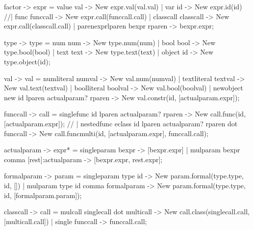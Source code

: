     factor      {-> expr}   =   {value} val                                             {-> New expr.val(val.val)}
                            |   {var} id                                                {-> New expr.id(id)}
                            //|   {func} funccall                                         {-> New expr.call(funccall.call)}
                            |   {classcall} classcall                                   {-> New expr.call(classcall.call)}
                            |   {parenexpr}lparen bexpr rparen                          {-> bexpr.expr};

    type        {-> type}   =   {num} num                                               {-> New type.num(num)}
                            |   {bool} bool                                             {-> New type.bool(bool)}
                            |   {text} text                                             {-> New type.text(text)}
                            |   {object} id                                             {-> New type.object(id)};

    val         {-> val}    =   {numliteral} numval                                     {-> New val.num(numval)}
                            |   {textliteral} textval                                   {-> New val.text(textval)}
                            |   {boolliteral} boolval                                   {-> New val.bool(boolval)}
                            |   {newobject} new id lparen actualparam? rparen           {-> New val.constr(id, [actualparam.expr])};

    funccall    {-> call}   =   {singlefunc} id lparen actualparam? rparen              {-> New call.func(id, [actualparam.expr])};
                    //        |   {nestedfunc} eclass id lparen actualparam? rparen dot funccall {-> New call.funcmulti(id, [actualparam.expr], funccall.call)};

    actualparam {-> expr*}  =   {singleparam} bexpr                                     {-> [bexpr.expr]}
                            |   {mulparam} bexpr comma [rest]:actualparam               {-> [bexpr.expr, rest.expr]};

    formalparam {-> param}  =   {singleparam} type id                                   {-> New param.formal(type.type, id, [])}
                            |   {mulparam} type id comma formalparam                    {-> New param.formal(type.type, id, [formalparam.param])};

    classcall   {-> call}   =   {mulcall} singlecall dot multicall                               {-> New call.class(singlecall.call, [multicall.call])}
                            |   {single} funccall                                       {-> funccall.call};

